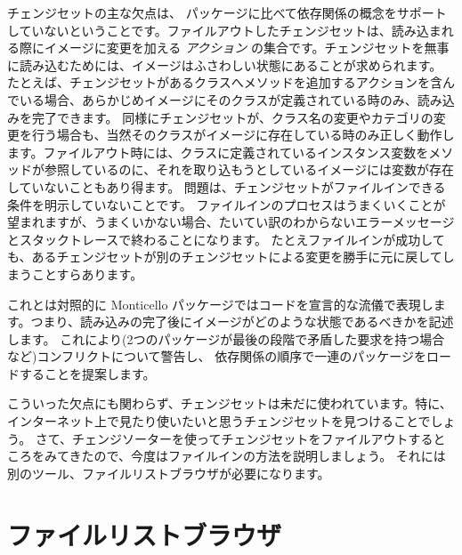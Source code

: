 \documentclass[a4paper,10pt,twoside]{book}
\begin{document}
チェンジセットの主な欠点は、 パッケージに比べて依存関係の概念をサポートしていないということです。ファイルアウトしたチェンジセットは、読み込まれる際にイメージに変更を加える \emph{アクション} の集合です。チェンジセットを無事に読み込むためには、イメージはふさわしい状態にあることが求められます。
たとえば、チェンジセットがあるクラスへメソッドを追加するアクションを含んでいる場合、あらかじめイメージにそのクラスが定義されている時のみ、読み込みを完了できます。
同様にチェンジセットが、クラス名の変更やカテゴリの変更を行う場合も、当然そのクラスがイメージに存在している時のみ正しく動作します。ファイルアウト時には、クラスに定義されているインスタンス変数をメソッドが参照しているのに、それを取り込もうとしているイメージには変数が存在していないこともあり得ます。
問題は、チェンジセットがファイルインできる条件を明示していないことです。
ファイルインのプロセスはうまくいくことが望まれますが、うまくいかない場合、たいてい訳のわからないエラーメッセージとスタックトレースで終わることになります。
たとえファイルインが成功しても、あるチェンジセットが別のチェンジセットによる変更を勝手に元に戻してしまうことすらあります。

これとは対照的に Monticello パッケージではコードを宣言的な流儀で表現します。つまり、読み込みの完了後にイメージがどのような状態であるべきかを記述します。
これにより(2つのパッケージが最後の段階で矛盾した要求を持つ場合など)コンフリクトについて警告し、
依存関係の順序で一連のパッケージをロードすることを提案します。

こういった欠点にも関わらず、チェンジセットは未だに使われています。特に、インターネット上で見たり使いたいと思うチェンジセットを見つけることでしょう。
さて、チェンジソーターを使ってチェンジセットをファイルアウトするところをみてきたので、今度はファイルインの方法を説明しましょう。
それには別のツール、ファイルリストブラウザが必要になります。


\section{ファイルリストブラウザ}
\end{document}
